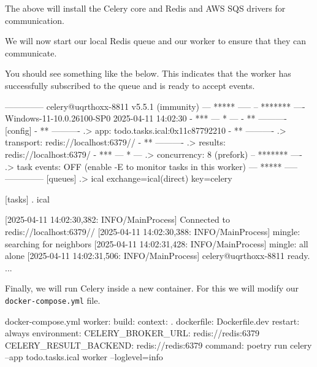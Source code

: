 \documentclass{csse4400}
\begin{document}

\noindent
The above will install the Celery core and Redis and AWS SQS drivers for communication.

We will now start our local Redis queue and our worker to ensure that they can communicate.



You should see something like the below.
This indicates that the worker has successfully subscribed to the queue and is ready to accept events.
%
\begin{code}[numbers=none]{}
 -------------- celery@uqrthoxx-8811 v5.5.1 (immunity)
--- ***** -----
-- ******* ---- Windows-11-10.0.26100-SP0 2025-04-11 14:02:30
- *** --- * ---
- ** ---------- [config]
- ** ---------- .> app:         todo.tasks.ical:0x11c87792210
- ** ---------- .> transport:   redis://localhost:6379//
- ** ---------- .> results:     redis://localhost:6379/
- *** --- * --- .> concurrency: 8 (prefork)
-- ******* ---- .> task events: OFF (enable -E to monitor tasks in this worker)
--- ***** -----
 -------------- [queues]
                .> ical             exchange=ical(direct) key=celery


[tasks]
  . ical

[2025-04-11 14:02:30,382: INFO/MainProcess] Connected to redis://localhost:6379//
[2025-04-11 14:02:30,388: INFO/MainProcess] mingle: searching for neighbors
[2025-04-11 14:02:31,428: INFO/MainProcess] mingle: all alone
[2025-04-11 14:02:31,506: INFO/MainProcess] celery@uqrthoxx-8811 ready.
...
\end{code}

Finally, we will run Celery inside a new container.
For this we will modify our \texttt{docker-compose.yml} file.
%
\begin{code}[numbers=none]{docker-compose.yml}
worker:
  build:
    context: .
    dockerfile: Dockerfile.dev
  restart: always
  environment:
    CELERY_BROKER_URL: redis://redis:6379
    CELERY_RESULT_BACKEND: redis://redis:6379
  command: poetry run celery --app todo.tasks.ical worker --loglevel=info
\end{code}
\end{document}
